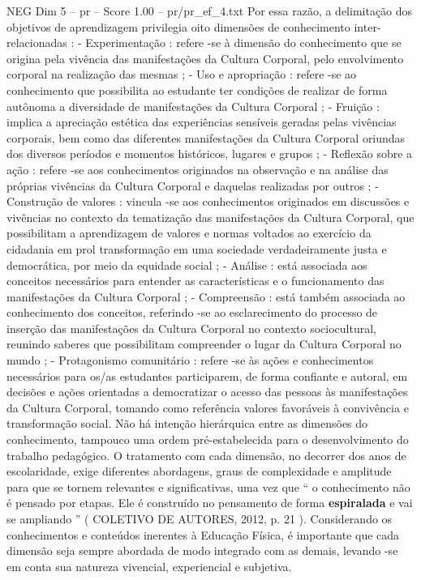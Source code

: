 \begin{textsample}{NEG Dim 5 – pr – Score 1.00 – pr/pr\_ef\_4.txt}
Por essa razão, a delimitação dos objetivos de aprendizagem privilegia oito dimensões de conhecimento inter-relacionadas : - Experimentação : refere -se à dimensão do conhecimento que se origina pela vivência das manifestações da Cultura Corporal, pelo envolvimento corporal na realização das mesmas ; - Uso e apropriação : refere -se ao conhecimento que possibilita ao estudante ter condições de realizar de forma autônoma a diversidade de manifestações da Cultura Corporal ; - Fruição : implica a apreciação estética das experiências sensíveis geradas pelas vivências corporais, bem como das diferentes manifestações da Cultura Corporal oriundas dos diversos períodos e momentos históricos, lugares e grupos ; - Reflexão sobre a ação : refere -se aos conhecimentos originados na observação e na análise das próprias vivências da Cultura Corporal e daquelas realizadas por outros ; - Construção de valores : vincula -se aos conhecimentos originados em discussões e vivências no contexto da tematização das manifestações da Cultura Corporal, que possibilitam a aprendizagem de valores e normas voltados ao exercício da cidadania em prol transformação em uma sociedade verdadeiramente justa e democrática, por meio da equidade social ; - Análise : está associada aos conceitos necessários para entender as características e o funcionamento das manifestações da Cultura Corporal ; - Compreensão : está também associada ao conhecimento dos conceitos, referindo -se ao esclarecimento do processo de inserção das manifestações da Cultura Corporal no contexto sociocultural, reunindo saberes que possibilitam compreender o lugar da Cultura Corporal no mundo ; - Protagonismo comunitário : refere -se às ações e conhecimentos necessários para os/as estudantes participarem, de forma confiante e autoral, em decisões e ações orientadas a democratizar o acesso das pessoas às manifestações da Cultura Corporal, tomando como referência valores favoráveis à convivência e transformação social.
Não há intenção hierárquica entre as dimensões do conhecimento, tampouco uma ordem pré-estabelecida para o desenvolvimento do trabalho pedagógico.
O tratamento com cada dimensão, no decorrer dos anos de escolaridade, exige diferentes abordagens, graus de complexidade e amplitude para que se tornem relevantes e significativas, uma vez que “ o conhecimento não é pensado por etapas.
Ele é construído no pensamento de forma \textbf{espiralada} e vai se ampliando ” ( COLETIVO DE AUTORES, 2012, p. 21 ).
Considerando os conhecimentos e conteúdos inerentes à Educação Física, é importante que cada dimensão seja sempre abordada de modo integrado com as demais, levando -se em conta sua natureza vivencial, experiencial e subjetiva.

\end{textsample}
